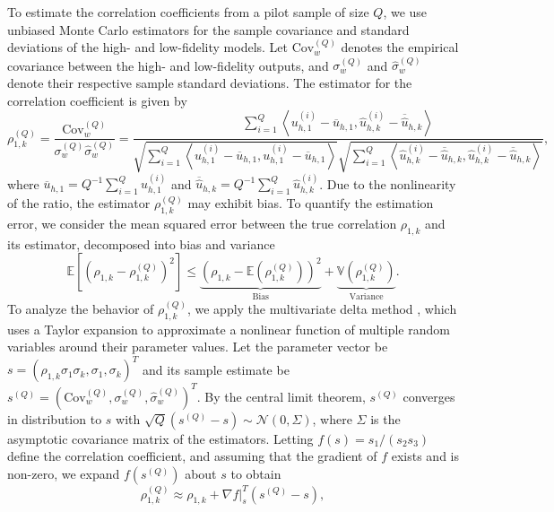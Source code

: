 To estimate the correlation coefficients from a pilot sample of size $Q$, we use unbiased Monte Carlo estimators for the sample covariance and standard deviations of the high- and low-fidelity models. Let $\text{Cov}_w^{(Q)}$ denotes the empirical covariance between the high- and low-fidelity outputs, and $\sigma_w^{(Q)}$ and $\widehat\sigma_w^{(Q)}$ denote their respective sample standard deviations. The estimator for the correlation coefficient is given by
%
\[
\rho_{1,k}^{(Q)} = \frac{\text{Cov}_w^{(Q)}}{\sigma_w^{(Q)}\widehat\sigma_w^{(Q)}} = \frac{\sum_{i=1}^Q\left\langle u_{h,1}^{(i)} - \overline{u}_{h,1}, \widehat u_{h,k}^{(i)} - \overline{\widehat u}_{h,k} \right\rangle}{\sqrt{\sum_{i=1}^Q \left\langle u_{h,1}^{(i)} - \overline{u}_{h,1}, u_{h,1}^{(i)} - \overline{u}_{h,1} \right\rangle} \sqrt{\sum_{i=1}^Q \left\langle \widehat u_{h,k}^{(i)} - \overline{\widehat u}_{h,k}, \widehat u_{h,k}^{(i)} - \overline{\widehat u}_{h,k} \right\rangle}},
\]
%
where $\overline{u}_{h,1} = Q^{-1}\sum_{i=1}^Q u_{h,1}^{(i)}$ and $\overline{\widehat  u}_{h,k} = Q^{-1}\sum_{i=1}^Q \widehat u_{h,k}^{(i)}$. Due to the nonlinearity of the ratio, the estimator $\rho_{1,k}^{(Q)}$ may exhibit bias. To quantify the estimation error, we consider the mean squared error between the true correlation $\rho_{1,k}$ and its estimator, decomposed into bias and variance
%
\begin{equation}
\label{eq:MSE_rho}
    \mathbb{E}\left[\left(\rho_{1,k} - \rho_{1,k}^{(Q)}\right)^2\right]\le \underbrace{\left(\rho_{1,k} - \mathbb{E}\left(\rho_{1,k}^{(Q)}\right)\right)^2}_{\text{Bias}}+\underbrace{\mathbb{V}\left(\rho_{1,k}^{(Q)}\right)}_{\text{Variance}}.
\end{equation}
%
To analyze the behavior of $\rho_{1,k}^{(Q)}$, we apply the multivariate delta method \cite{Cr:1946,Oe:1992}, which uses a Taylor expansion to approximate a nonlinear function of multiple random variables around their parameter values. Let the parameter vector be $s = (\rho_{1,k}\sigma_1\sigma_k, \sigma_1, \sigma_k)^T$ and its sample estimate be $s^{(Q)} = (\text{Cov}_w^{(Q)}, \sigma_w^{(Q)}, \widehat\sigma_w^{(Q)})^T$. By the central limit theorem, $s^{(Q)}$ converges in distribution to $s$ with $\sqrt{Q}(s^{(Q)}-s)\sim \mathcal{N}(0,\Sigma)$, where $\Sigma$ is the asymptotic covariance matrix of the estimators. Letting $f(s) = s_1 / (s_2 s_3)$ define the correlation coefficient, and assuming that the gradient of $f$ exists and is non-zero, we expand $f(s^{(Q)})$ about $s$ to obtain
%
\begin{equation}
\label{eq:Correlated_Coeff_approx}
  \rho_{1,k}^{(Q)} \approx \rho_{1,k} + \nabla f |_{s}^T \left(s^{(Q)}-s\right), 
\end{equation}
